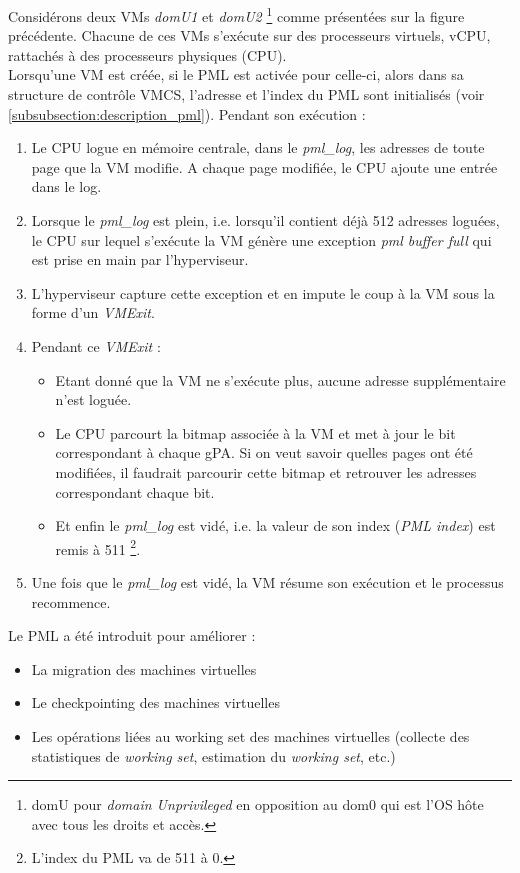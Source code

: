 Considérons deux VMs \textit{domU1} et \textit{domU2} \footnote{domU pour \textit{domain Unprivileged} en opposition au dom0 qui est l'OS hôte avec tous les droits et accès.} comme présentées sur la figure précédente. Chacune de ces VMs s'exécute sur des processeurs virtuels, \ac{vCPU}, rattachés à des processeurs physiques (\acs{CPU}).\\
Lorsqu'une VM est créée, si le PML est activée pour celle-ci, alors dans sa structure de contrôle \ac{VMCS}, l'adresse et l'index du PML sont initialisés (voir \ref{subsubsection:description_pml}). Pendant son exécution :

\begin{enumerate}[label=\textbf{(\roman*)}]
    \item Le CPU logue en mémoire centrale, dans le \textit{pml\_log}, les adresses de toute page que la VM modifie. A chaque page modifiée, le CPU ajoute une entrée dans le log.
    \item Lorsque le \textit{pml\_log} est plein, i.e. lorsqu'il contient déjà 512 adresses loguées, le CPU sur lequel s'exécute la VM génère une exception \textit{pml buffer full} qui est prise en main par l'hyperviseur.
    \item L'hyperviseur capture cette exception et en impute le coup à la VM sous la forme d'un \textit{VMExit}.
    \item Pendant ce \textit{VMExit} :
    
        \begin{itemize}
            \item Etant donné que la VM ne s'exécute plus, aucune adresse supplémentaire n'est loguée.
            \item Le CPU parcourt la bitmap associée à la VM et met à jour le bit correspondant à chaque gPA. Si on veut savoir quelles pages ont été modifiées, il faudrait parcourir cette bitmap et retrouver les adresses correspondant chaque bit.
            \item Et enfin le \textit{pml\_log} est vidé, i.e. la valeur de son index (\textit{PML index}) est remis à 511 \footnote{L'index du PML va de 511 à 0.}. 
        \end{itemize}
    
    \item Une fois que le \textit{pml\_log} est vidé, la VM résume son exécution et le processus recommence.
\end{enumerate}

\noindent Le PML a été introduit pour améliorer :
\begin{itemize}
    \item La migration des machines virtuelles
    \item Le checkpointing \cite{checkpointing} des machines virtuelles
    \item Les opérations liées au working set des machines virtuelles (collecte des statistiques de \textit{working set}, estimation du \textit{working set}, etc.)
\end{itemize}

